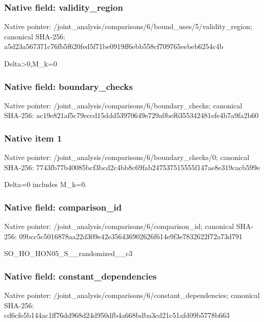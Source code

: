 \documentclass[10pt,a4paper]{article}
\begin{document}
\subsubsection{Native field: validity\_\allowbreak{}region}
Native pointer: /joint\_\allowbreak{}analysis/comparisons/6/bound\_\allowbreak{}uses/5/validity\_\allowbreak{}region; canonical SHA-256: a5d23a567371c76fb5f620fed5f71be0919ff6ebb558cf709765eebeb6254c4b

\begingroup\raggedright\sloppy Delta>0,\allowbreak{}M\_\allowbreak{}k=\allowbreak{}0\par\endgroup

\subsubsection{Native field: boundary\_\allowbreak{}checks}
Native pointer: /joint\_\allowbreak{}analysis/comparisons/6/boundary\_\allowbreak{}checks; canonical SHA-256: ac19e821af5c79eccd15ddd53970649e729a0bef6355342481efe4b7a9fa2b60

\subsubsection{Native item 1}
Native pointer: /joint\_\allowbreak{}analysis/comparisons/6/boundary\_\allowbreak{}checks/0; canonical SHA-256: 7743fb77b40085bcf3bcd2c4bb8c69fab247537515555f147ae8e319cacb599e

\begingroup\raggedright\sloppy Delta=\allowbreak{}0 includes M\_\allowbreak{}k=\allowbreak{}0.\par\endgroup

\subsubsection{Native field: comparison\_\allowbreak{}id}
Native pointer: /joint\_\allowbreak{}analysis/comparisons/6/comparison\_\allowbreak{}id; canonical SHA-256: 09bcc5c5016878aa22d309e42e356436902626f614e9f3e7832622f72a73d791

\begingroup\raggedright\sloppy SO\_\allowbreak{}HO\_\allowbreak{}HON05\_\allowbreak{}S\_\allowbreak{}\_\allowbreak{}randomized\_\allowbreak{}\_\allowbreak{}c3\par\endgroup

\subsubsection{Native field: constant\_\allowbreak{}dependencies}
Native pointer: /joint\_\allowbreak{}analysis/comparisons/6/constant\_\allowbreak{}dependencies; canonical SHA-256: cd6cfe5b144ac1ff76dd968d24d950dfb4a668bdba3cd21c51afd09b5778b663
\end{document}
